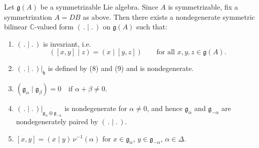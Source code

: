 \documentclass[12pt]{article}
\begin{document}
\begin{theorem}\label{thm:invariant-bilinear-form}
    Let $\mathfrak{g}(A)$ be a symmetrizable Lie algebra. Since $A$ is symmetrizable, fix a symmetrization $A = DB$ as above. Then there exists a nondegenerate symmetric bilinear $\mathbb{C}$-valued form
    $(\,.\mid.\,)$ on $\mathfrak{g}(A)$ such that:
    \begin{enumerate}[label=\alph*)]
        \item $(\,.\mid.\,)$ is invariant, i.e.
              \[
                  ([x,y]\mid z) = (x \mid [y,z])
                  \qquad \text{for all } x,y,z \in \mathfrak{g}(A).
              \]
        \item $(\,.\mid.\,)|_{\mathfrak{h}}$ is defined by (8) and (9) and is nondegenerate.
        \item $(\mathfrak{g}_\alpha \mid \mathfrak{g}_\beta) = 0
                  \quad \text{if } \alpha+\beta \neq 0$.
        \item $(\,.\mid.\,)|_{\mathfrak{g}_\alpha \oplus \mathfrak{g}_{-\alpha}}$
              is nondegenerate for $\alpha \neq 0$, and hence
              $\mathfrak{g}_\alpha$ and $\mathfrak{g}_{-\alpha}$ are
              nondegenerately paired by $(\,.\mid.\,)$.
        \item $[x,y] = (x \mid y)\,\nu^{-1}(\alpha)$
              for $x \in \mathfrak{g}_\alpha$, $y \in \mathfrak{g}_{-\alpha}$,
              $\alpha \in \Delta$.
    \end{enumerate}
\end{theorem}
\end{document}
